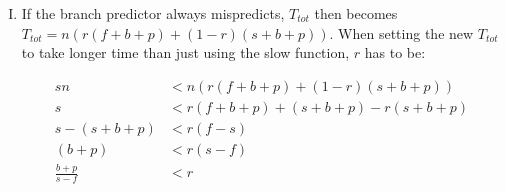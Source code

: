 \documentclass[fontsize=11pt, paper=a4, titlepage]{article}
\begin{document}
\begin{enumerate}[a)]
\begin{enumerate}[I)]
    \item If the branch predictor always mispredicts, $T_{tot}$ then becomes
$T_{tot} = n(r(f+b+p) + (1-r)(s+b+p))$. When setting the new $T_{tot}$ to take
longer time than just using the slow function, $r$ has to be:

        \begin{align*}
            sn &< n(r(f+b+p) + (1-r)(s+b+p)) \\
            s &< r(f+b+p) + (s+b+p) -r(s+b+p) \\
            s - (s+b+p) &< r(f-s) \\
            (b+p) &< r(s-f) \\
            \frac{b+p}{s-f} &< r
        \end{align*}

    \end{enumerate}
\end{enumerate}
\end{document}
